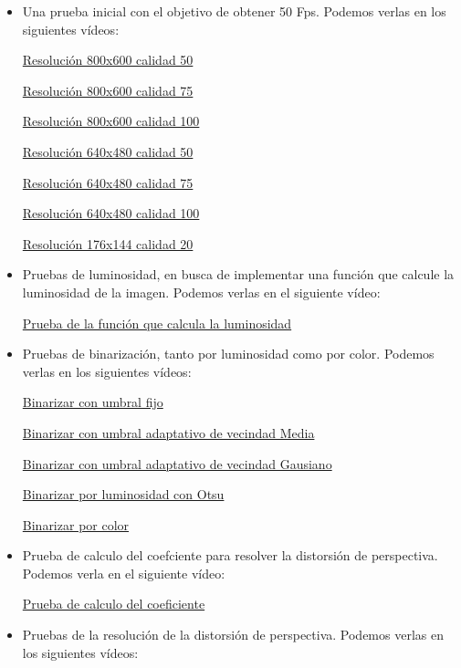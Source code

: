 \begin{itemize}
	\item Una prueba inicial con el objetivo de obtener 50 Fps. Podemos verlas en los siguientes vídeos:
	
	\href{https://youtu.be/r73s9I_8SiI}{Resolución 800x600 calidad 50}
	
	\href{https://youtu.be/rdv0COnl-G4}{Resolución 800x600 calidad 75}
	
	\href{https://youtu.be/tGip7sWjD8E}{Resolución 800x600 calidad 100}
	
	\href{https://youtu.be/saFDDQNjsEs}{Resolución 640x480 calidad 50}
	
	\href{https://youtu.be/a3ZxLQB37k0}{Resolución 640x480 calidad 75}
	
	\href{https://youtu.be/zu8rWr31fuQ}{Resolución 640x480 calidad 100}
	
	\href{https://youtu.be/WzJjXKeKpaI}{Resolución 176x144 calidad 20}	
	
	\item Pruebas de luminosidad, en busca de implementar una función que calcule la luminosidad de la imagen. Podemos verlas en el siguiente vídeo:
	
	\href{https://youtu.be/CuTADdioU4g}{Prueba de la función que calcula la luminosidad}	
	
	\item Pruebas de binarización, tanto por luminosidad como por color. Podemos verlas en los siguientes vídeos:
	
	\href{https://youtu.be/Gu_HvPr3cCU}{Binarizar con umbral fijo}
	
	\href{https://youtu.be/NCWQ2I-1J_o}{Binarizar con umbral adaptativo de vecindad Media}
	
	\href{https://youtu.be/XPxqk3kNXKY}{Binarizar con umbral adaptativo de vecindad Gausiano}
	
	\href{https://youtu.be/4CW4r9qdo4Y}{Binarizar por luminosidad con Otsu}
	
	\href{https://youtu.be/Rks5PkxDeZQ}{Binarizar por color}
		
	
	\item Prueba de calculo del coefciente para resolver la distorsión de perspectiva. Podemos verla en el siguiente vídeo: 
	
	\href{https://youtu.be/Y9QgFIMXSiU}{Prueba de calculo del coeficiente}
	\item Pruebas de la resolución de la distorsión de perspectiva. Podemos verlas en los siguientes vídeos:
	

\end{itemize}
